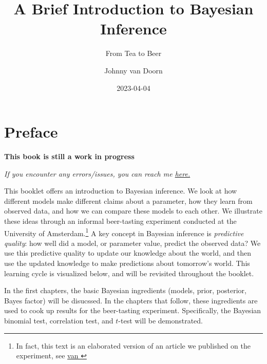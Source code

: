 \documentclass[
]{book}
\title{A Brief Introduction to Bayesian Inference}
\subtitle{From Tea to Beer}
\author{Johnny van Doorn}
\date{2023-04-04}
\begin{document}
\maketitle

{
\hypersetup{linkcolor=}
\setcounter{tocdepth}{1}
\tableofcontents
}
\hypertarget{preface}{%
\chapter*{Preface}\label{preface}}

\textbf{This book is still a work in progress}

\emph{If you encounter any errors/issues, you can reach me \href{mailto:j.b.vandoorn@uva.nl}{here.}}

This booklet offers an introduction to Bayesian inference. We look at how different models make different claims about a parameter, how they learn from observed data, and how we can compare these models to each other. We illustrate these ideas through an informal beer-tasting experiment conducted at the University of Amsterdam.\footnote{In fact, this text is an elaborated version of an article we published on the experiment, see \href{https://journals.sagepub.com/doi/full/10.1177/1475725719848574}{van \citet{vanDoorn2020class}}}
A key concept in Bayesian inference is \emph{predictive quality}: how well did a model, or parameter value, predict the observed data? We use this predictive quality to update our knowledge about the world, and then use the updated knowledge to make predictions about tomorrow's world. This learning cycle is visualized below, and will be revisited throughout the booklet.

In the first chapters, the basic Bayesian ingredients (models, prior, posterior, Bayes factor) will be disucssed. In the chapters that follow, these ingredients are used to cook up results for the beer-tasting experiment. Specifically, the Bayesian binomial test, correlation test, and \(t\)-test will be demonstrated.
\end{document}
